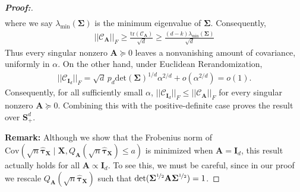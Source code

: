 \documentclass[11pt,twoside]{article}
\theoremstyle{definition}
\theoremstyle{remark}
\begin{document}
\begin{proof}[\textbf{Proof:}]
\begin{align*}
\end{align*}
where we say $\lambda_{\min}(\mathbf{\Sigma})$ is the minimum eigenvalue of $\mathbf{\Sigma}$. Consequently,
\begin{align*}
    ||\mathcal{C}_{\mathbf{A}}||_F \geq \frac{\text{tr}(\mathcal{C}_{\mathbf{A}})}{\sqrt{d}} \geq \frac{(d-k)\lambda_{\min}(\mathbf{\Sigma})}{\sqrt{d}}
\end{align*}
Thus every singular nonzero $\mathbf{A} \succeq 0$ leaves a nonvanishing amount of covariance, uniformly in $\alpha$. On the other hand, under Euclidean Rerandomization,
\begin{align*}
    ||\mathcal{C}_{\mathbf{I}_d}||_F = \sqrt{d} \,p_d\text{det}(\mathbf{\Sigma})^{1/d}\alpha^{2/d} + o(\alpha^{2/d}) = o(1).
\end{align*}
Consequently, for all sufficiently small $\alpha$, $||\mathcal{C}_{\mathbf{I}_d}||_F \leq ||\mathcal{C}_{\mathbf{A}}||_F$ for every singular nonzero $\mathbf{A} \succeq 0$. Combining this with the
positive-definite case proves the result over $\mathbf{S}^d_{+}$. 

\noindent \textbf{Remark:} Although we show that the Frobenius norm of $\text{Cov}\left(\sqrt{n}\widehat{\bm{\tau}}_{\mathbf{X}} \mid \mathbf{X}, Q_{\mathbf{A}}(\sqrt{n} \widehat{\bm{\tau}}_{\mathbf{X}}) \leq a\right)$ is minimized when $\mathbf{A} = \mathbf{I}_d$, this result actually holds for all $\mathbf{A} \propto \mathbf{I}_d$. To see this, we must be careful, since in our proof we rescale $Q_{\mathbf{A}}(\sqrt{n} \widehat{\bm{\tau}}_{\mathbf{X}})$ such that $\text{det}(\mathbf{\Sigma}^{\nicefrac{1}{2}} \mathbf{A} \mathbf{\Sigma}^{\nicefrac{1}{2}}) = 1$.


\end{proof}
\end{document}
